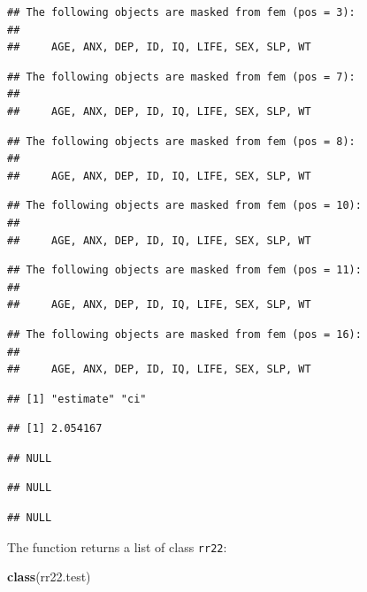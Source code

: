 \documentclass[12pt,a4paper]{book}
\newenvironment{Shaded}{\begin{snugshade}}{\end{snugshade}}
\newcommand{\KeywordTok}[1]{\textcolor[rgb]{0.13,0.29,0.53}{\textbf{#1}}}
\newcommand{\NormalTok}[1]{#1}
\theoremstyle{definition}
\theoremstyle{definition}
\theoremstyle{definition}
\theoremstyle{remark}
\begin{document}
\begin{verbatim}
## The following objects are masked from fem (pos = 3):
## 
##     AGE, ANX, DEP, ID, IQ, LIFE, SEX, SLP, WT
\end{verbatim}

\begin{verbatim}
## The following objects are masked from fem (pos = 7):
## 
##     AGE, ANX, DEP, ID, IQ, LIFE, SEX, SLP, WT
\end{verbatim}

\begin{verbatim}
## The following objects are masked from fem (pos = 8):
## 
##     AGE, ANX, DEP, ID, IQ, LIFE, SEX, SLP, WT
\end{verbatim}

\begin{verbatim}
## The following objects are masked from fem (pos = 10):
## 
##     AGE, ANX, DEP, ID, IQ, LIFE, SEX, SLP, WT
\end{verbatim}

\begin{verbatim}
## The following objects are masked from fem (pos = 11):
## 
##     AGE, ANX, DEP, ID, IQ, LIFE, SEX, SLP, WT
\end{verbatim}

\begin{verbatim}
## The following objects are masked from fem (pos = 16):
## 
##     AGE, ANX, DEP, ID, IQ, LIFE, SEX, SLP, WT
\end{verbatim}

\begin{verbatim}
## [1] "estimate" "ci"
\end{verbatim}

\begin{verbatim}
## [1] 2.054167
\end{verbatim}

\begin{verbatim}
## NULL
\end{verbatim}

\begin{verbatim}
## NULL
\end{verbatim}

\begin{verbatim}
## NULL
\end{verbatim}

The function returns a list of class \texttt{rr22}:

\begin{Shaded}
\begin{Highlighting}[]
\KeywordTok{class}\NormalTok{(rr22.test)}
\end{Highlighting}
\end{Shaded}
\end{document}
